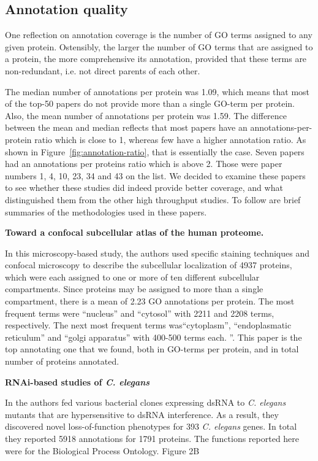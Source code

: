 \documentclass[10pt]{article}
\begin{document}
\subsection*{Annotation quality}

One reflection on annotation coverage is the number of GO terms assigned to any
given protein. Ostensibly, the larger the number of GO terms that are assigned to a
protein, the more comprehensive its annotation, provided that these terms are
non-redundant, i.e. not direct parents of each other. 

The median number of annotations per protein was 1.09, which means that most of the top-50
papers do not provide more than a single GO-term per protein. Also, the mean number of
annotations per protein was 1.59. The difference between the mean and median reflects that
most papers have an annotations-per-protein ratio which is close to 1, whereas few have a
higher annotation ratio. As shown in Figure~\ref{fig:annotation-ratio}, that is essentially
the case. Seven papers had an annotations per proteins ratio which is above 2. Those
were paper numbers 1, 4, 10, 23, 34 and 43 on the list. We decided to examine these papers
to see whether these studies did indeed provide better coverage, and what distinguished them
from the other high throughput studies. To follow are brief summaries of the
methodologies used in these papers.

\textbf{Toward a confocal subcellular atlas of the human proteome.}

In this microscopy-based study, the authors used specific staining techniques and confocal
microscopy to describe the subcellular localization of 4937 proteins, which were each assigned
to one or more of ten different subcellular compartments. Since proteins may be assigned to more
than a single compartment, there is a mean of 2.23 GO annotations per protein. The most frequent
terms were ``nucleus'' and ``cytosol'' with 2211 and 2208 terms, respectively. The next
most frequent terms was``cytoplasm'', ``endoplasmatic reticulum'' and ``golgi apparatus'' with
400-500 terms each.  ''\cite{PMID:11121744}. This paper is the top annotating one that we found,
both in GO-terms per protein, and in total number of proteins annotated. 

\textbf{RNAi-based studies of \textit{C. elegans}}

In \cite{PMID:17417969} the authors fed various bacterial clones expressing dsRNA to \textit{C.
elegans} mutants that are hypersensitive to dsRNA interference. As  a result, they discovered
novel loss-of-function phenotypes for 393 \textit{C. elegans} genes. In total they reported 5918
annotations for 1791 proteins.  The functions reported here were for the Biological Process
Ontology. Figure 2B 
\end{document}
